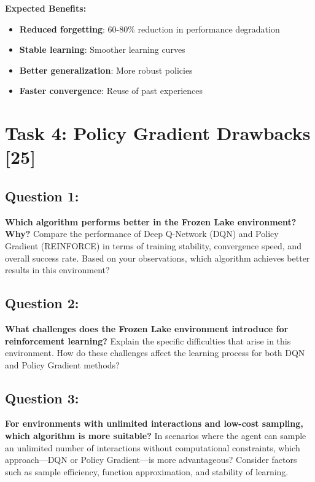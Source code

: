 \documentclass[12pt]{article}
\begin{document}
{{{\textbf{Expected Benefits:}
\begin{itemize}
    \item \textbf{Reduced forgetting}: 60-80\% reduction in performance degradation
    \item \textbf{Stable learning}: Smoother learning curves
    \item \textbf{Better generalization}: More robust policies
    \item \textbf{Faster convergence}: Reuse of past experiences
\end{itemize}

\newpage

\section{Task 4: Policy Gradient Drawbacks [25]}

\subsection{Question 1:}
\textbf{Which algorithm performs better in the Frozen Lake environment? Why?}
\newline
Compare the performance of Deep Q-Network (DQN) and Policy Gradient (REINFORCE) in terms of training stability, convergence speed, and overall success rate. Based on your observations, which algorithm achieves better results in this environment?

\subsection{Question 2:}
\textbf{ What challenges does the Frozen Lake environment introduce for reinforcement learning?}
\newline
Explain the specific difficulties that arise in this environment. How do these challenges affect the learning process for both DQN and Policy Gradient methods?

\subsection{Question 3:}
\textbf{For environments with unlimited interactions and low-cost sampling, which algorithm is more suitable?}
\newline
In scenarios where the agent can sample an unlimited number of interactions without computational constraints, which approach—DQN or Policy Gradient—is more advantageous? Consider factors such as sample efficiency, function approximation, and stability of learning.

}}}
\end{document}
